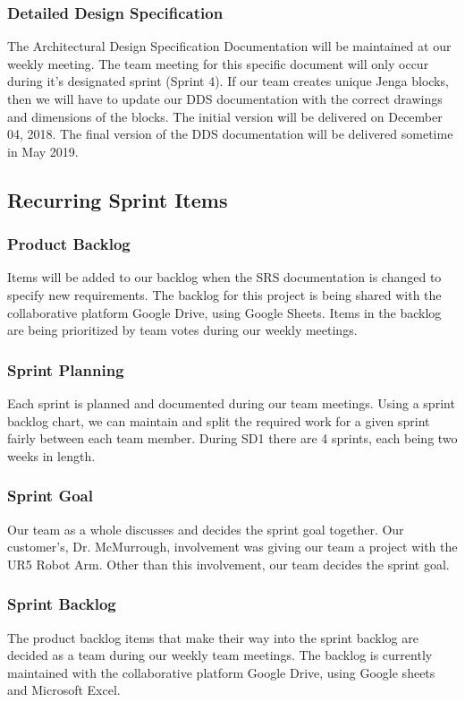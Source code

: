\subsubsection{Detailed Design Specification}
The Architectural Design Specification Documentation will be maintained at our weekly meeting. The team meeting for this specific document will only occur during it's designated sprint (Sprint 4). If our team creates unique Jenga blocks, then we will have to update our DDS documentation with the correct drawings and dimensions of the blocks. The initial version will be delivered on December 04, 2018. The final version of the DDS documentation will be delivered sometime in May 2019.

\subsection{Recurring Sprint Items}

\subsubsection{Product Backlog}
Items will be added to our backlog when the SRS documentation is changed to specify new requirements. The backlog for this project is being shared with the collaborative platform Google Drive, using Google Sheets. Items in the backlog are being prioritized by team votes during our weekly meetings.

\subsubsection{Sprint Planning}
Each sprint is planned and documented during our team meetings. Using a sprint backlog chart, we can maintain and split the required work for a given sprint fairly between each team member. During SD1 there are 4 sprints, each being two weeks in length. 

\subsubsection{Sprint Goal}
Our team as a whole discusses and decides the sprint goal together. Our customer's, Dr. McMurrough, involvement was giving our team a project with the UR5 Robot Arm. Other than this involvement, our team decides the sprint goal.

\subsubsection{Sprint Backlog}
The product backlog items that make their way into the sprint backlog are decided as a team during our weekly team meetings. The backlog is currently maintained with the collaborative platform Google Drive, using Google sheets and Microsoft Excel.  

